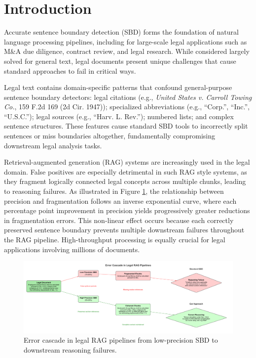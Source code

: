 \section{Introduction}
Accurate sentence boundary detection (SBD) forms the foundation of natural language processing pipelines, \cite{gillick2009sentence, read2012sentence, schweter2019deep} including for large-scale legal applications such as M\&A due diligence, contract review, and legal research. While considered largely solved for general text, legal documents present unique challenges that cause standard approaches to fail in critical ways.

Legal text contains domain-specific patterns that confound general-purpose sentence boundary detectors: legal citations (e.g., \textit{United States v. Carroll Towing Co.}, 159 F.2d 169 (2d Cir. 1947)); specialized abbreviations (e.g., ``Corp.'', ``Inc.'', ``U.S.C.''); legal sources (e.g., ``Harv. L. Rev.''); numbered lists; and complex sentence structures. These features cause standard SBD tools to incorrectly split sentences or miss boundaries altogether, fundamentally compromising downstream legal analysis tasks.

Retrieval-augmented generation (RAG) systems are increasingly used in the legal domain. \cite{pipitone2024legalbench, wiratunga2024cbr, hindi2025enhancing}  False positives are especially detrimental in such RAG style systems, as they fragment logically connected legal concepts across multiple chunks, leading to reasoning failures. As illustrated in Figure \ref{fig:rag-error-cascade}, the relationship between precision and fragmentation follows an inverse exponential curve, where each percentage point improvement in precision yields progressively greater reductions in fragmentation errors. This non-linear effect occurs because each correctly preserved sentence boundary prevents multiple downstream failures throughout the RAG pipeline. High-throughput processing is equally crucial for legal applications involving millions of documents.

\begin{figure}[t]
\centering
\includegraphics[width=1.05\textwidth]{figures/rag_error_cascade.pdf}
\caption{Error cascade in legal RAG pipelines from low-precision SBD to downstream reasoning failures.}
\label{fig:rag-error-cascade}
\end{figure}

